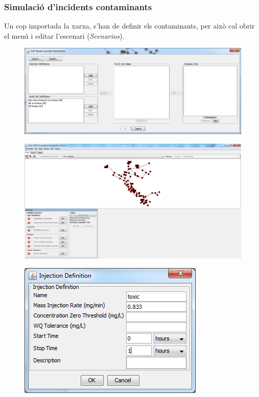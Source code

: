 \documentclass[12pt]{article}
\begin{document}
\subsubsection{Simulació d'incidents contaminants\label{epa_contaminants}}
Un cop importada la xarxa, s'han de definir els contaminants, per això cal obrir el menú  i editar l'escenari (\textit{Scenarios}).
\begin{figure}[h!]
	\centering
	\includegraphics[scale=.4]{imatges/teva-spot/3.png}
\end{figure}
\clearpage
\begin{figure}
	\includegraphics[scale=.4]{imatges/teva-spot/4.png}
\end{figure}
\begin{figure}
	\centering
	\includegraphics[scale=.4]{imatges/teva-spot/5.png}
\end{figure}
\end{document}
